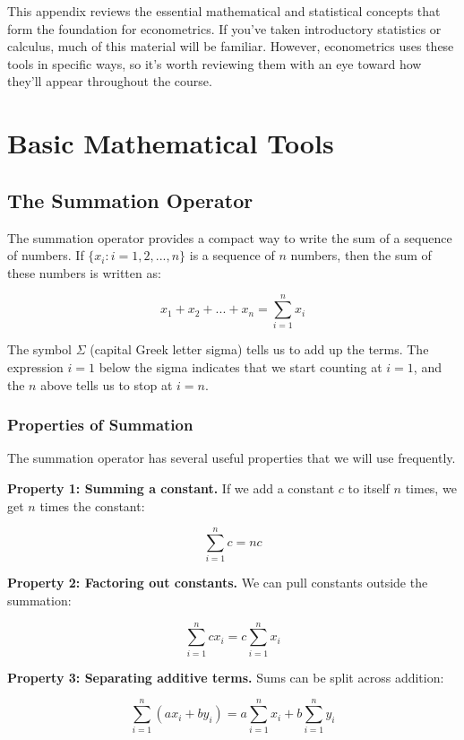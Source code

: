 \documentclass[
  letterpaper,
  DIV=11,
  numbers=noendperiod]{scrreprt}
\begin{document}
This appendix reviews the essential mathematical and statistical
concepts that form the foundation for econometrics. If you've taken
introductory statistics or calculus, much of this material will be
familiar. However, econometrics uses these tools in specific ways, so
it's worth reviewing them with an eye toward how they'll appear
throughout the course.

\section{Basic Mathematical Tools}\label{basic-mathematical-tools}

\subsection{The Summation Operator}\label{the-summation-operator}

The summation operator provides a compact way to write the sum of a
sequence of numbers. If \(\{x_i: i = 1, 2, ..., n\}\) is a sequence of
\(n\) numbers, then the sum of these numbers is written as:

\[
x_1 + x_2 + ... + x_n = \sum_{i=1}^{n} x_i
\]

The symbol \(\Sigma\) (capital Greek letter sigma) tells us to add up
the terms. The expression \(i=1\) below the sigma indicates that we
start counting at \(i=1\), and the \(n\) above tells us to stop at
\(i=n\).

\subsubsection{Properties of Summation}\label{properties-of-summation}

The summation operator has several useful properties that we will use
frequently.

\textbf{Property 1: Summing a constant.} If we add a constant \(c\) to
itself \(n\) times, we get \(n\) times the constant:

\[
\sum_{i=1}^{n} c = nc
\]

\textbf{Property 2: Factoring out constants.} We can pull constants
outside the summation:

\[
\sum_{i=1}^{n} cx_i = c \sum_{i=1}^{n} x_i
\]

\textbf{Property 3: Separating additive terms.} Sums can be split across
addition:

\[
\sum_{i=1}^{n} (ax_i + by_i) = a\sum_{i=1}^{n} x_i + b\sum_{i=1}^{n} y_i
\]
\end{document}
